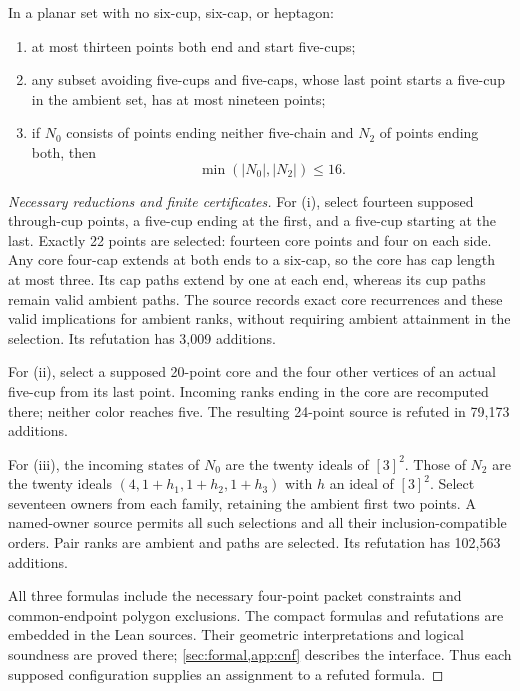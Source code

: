 \begin{lemma}\label{lem:populations}
In a planar set with no six-cup, six-cap, or heptagon:
\begin{enumerate}[label=(\roman*)]
\item at most thirteen points both end and start five-cups;
\item any subset avoiding five-cups and five-caps, whose last point
starts a five-cup in the ambient set, has at most nineteen points;
\item if $N_0$ consists of points ending neither five-chain and $N_2$
of points ending both, then
\[\min(|N_0|,|N_2|)\le16.\]
\end{enumerate}
\end{lemma}
\begin{proof}[Necessary reductions and finite certificates]
For (i), select fourteen supposed through-cup points, a five-cup ending
at the first, and a five-cup starting at the last. Exactly 22 points
are selected: fourteen core points and four on each side. Any core
four-cap extends at both ends to a six-cap, so the core has cap length
at most three. Its cap paths extend by one at each end, whereas its
cup paths remain valid ambient paths. The source records exact core
recurrences and these valid implications for ambient ranks, without
requiring ambient attainment in the selection. Its refutation has
3,009 additions.

For (ii), select a supposed 20-point core and the four other vertices
of an actual five-cup from its last point. Incoming ranks ending in
the core are recomputed there; neither color reaches five. The resulting
24-point source is refuted in 79,173 additions.

For (iii), the incoming states of $N_0$ are the twenty ideals of
$[3]^2$. Those of $N_2$ are the twenty ideals
$(4,1+h_1,1+h_2,1+h_3)$ with $h$ an ideal of $[3]^2$. Select seventeen
owners from each family, retaining the ambient first two points.
A named-owner source permits all such selections and all their
inclusion-compatible orders. Pair ranks are ambient and paths are
selected. Its refutation has 102,563 additions.

All three formulas include the necessary four-point packet constraints
and common-endpoint polygon exclusions. The compact formulas and refutations are embedded in the Lean sources.
Their geometric interpretations and logical soundness are proved there;
\cref{sec:formal,app:cnf} describes the interface. Thus each
supposed configuration supplies an assignment to a refuted formula.
\end{proof}

